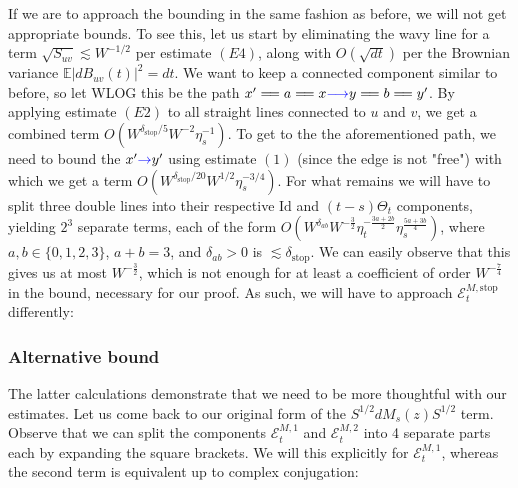 \documentclass[11pt]{article}
\newcommand{\E}{\mathcal{E}}
\newcommand{\sto}{\text{stop}}
\begin{document}
\begin{center}
\end{center}
If we are to approach the bounding in the same fashion as before, we will not get appropriate bounds. To see this, let us start by eliminating the wavy line for a term  $\sqrt{S_{uv}}\lesssim W^{-1/2}$ per estimate $(E4)$, along with $O(\sqrt{dt})$ per the Brownian variance $\mathbb{E}\left\vert dB_{uv}(t)\right\vert^2=dt$. We want to keep a connected component similar to before, so let WLOG this be the path $x'=\!= a=\!= x\textcolor{blue}{\longrightarrow }y=\!= b=\!= y'$. By applying estimate $(E2)$ to all straight lines connected to $u$ and $v$, we get a combined term $O(W^{\delta_\sto/5}W^{-2}\eta_s^{-1})$. To get to the the aforementioned path, we need to bound the $x'\textcolor{blue}{\rightarrow}y'$ using estimate $(1)$ (since the edge is not "free") with which we get a term $O(W^{\delta_\sto/20}W^{1/2}\eta_s^{-3/4})$. For what remains we will have to split three double lines into their respective $\text{Id}$ and $(t-s)\Theta_t$ components, yielding $2^3$ separate terms, each of the form $O\left(W^{\delta_{ab}}W^{-\frac{3}{2}}\eta_t^{-\frac{3a+2b}{2}}\eta_{s}^{\frac{5a+3b}{4}}\right)$, where $a, b\in \{0, 1, 2, 3\}$,  $a+b=3$, and $\delta_{ab}>0$ is $\lesssim\delta_\sto$. We can easily observe that this gives us at most $W^{-\frac{3}{2}}$, which is not enough for at least a coefficient of order $W^{-\frac{7}{4}}$ in the bound, necessary for our proof. As such, we will have to approach $\E_t^{M, \sto}$ differently:


\subsubsection*{Alternative bound}
The latter calculations demonstrate that we need to be more thoughtful with our estimates. Let us come back to our original form of the $S^{1/2}dM_s(z)S^{1/2}$ term. Observe that we can split the components $\E_t^{M, 1}$ and $\E_t^{M, 2}$ into 4 separate parts each by expanding the square brackets. We will this explicitly for $\mathcal{E}_{t}^{M, 1}$, whereas the second term is equivalent up to complex conjugation:
\end{document}
